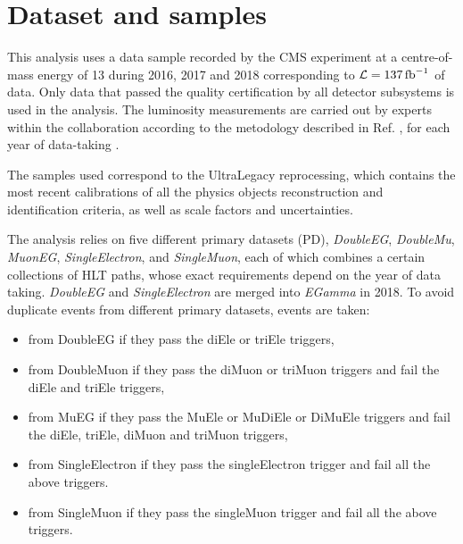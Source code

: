 \section{Dataset and samples}
\label{sec:datasets}

This analysis uses a data sample recorded by the CMS experiment at a centre-of-mass energy of 13 \TeV during 2016, 2017 and 2018 corresponding to $\mathcal{L} = 137 \mbox{\ensuremath{\,\text{fb}^{-1}}}$ of data.
Only data that passed the quality certification by all detector subsystems is used in the analysis.
The luminosity measurements are carried out by experts within the collaboration according to the metodology described in Ref. \cite{CMS:LUM-17-003}, for each year of data-taking \cite{CMS:LUM-17-004, CMS:LUM-18-002}.

The samples used correspond to the UltraLegacy reprocessing, which contains the most recent calibrations of all the physics objects reconstruction and identification criteria, as well as scale factors and uncertainties.

The analysis relies on five different primary datasets (PD), 
{\it DoubleEG}, {\it DoubleMu}, {\it MuonEG}, {\it SingleElectron}, and {\it SingleMuon},
each of which combines a certain collections of HLT paths, whose exact requirements depend on the year of data 
taking. {\it DoubleEG} and {\it SingleElectron} are merged into {\it EGamma} in 2018.
To avoid duplicate events from different primary datasets, events are taken:

\begin{itemize}
\item from DoubleEG if they pass the diEle %
  or triEle triggers, %
\item from DoubleMuon if they pass the diMuon %
  or triMuon %
  triggers and fail the diEle and triEle triggers,
\item from MuEG if they pass the MuEle %
  or MuDiEle %
  or DiMuEle %
  triggers and fail the diEle, triEle, diMuon and triMuon triggers,
\item from SingleElectron if they pass the singleElectron trigger %
  and fail all the above triggers.
\item from SingleMuon if they pass the singleMuon trigger %
  and fail all the above triggers. 
\end{itemize} 

